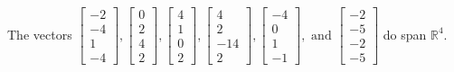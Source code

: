 \begin{exercise}
\begin{exerciseStatement}
  \end{exerciseStatement}
  \begin{exerciseAnswer}
   The vectors \(\left[\begin{array}{r}
-2 \\
-4 \\
1 \\
-4
\end{array}\right] , \left[\begin{array}{r}
0 \\
2 \\
4 \\
2
\end{array}\right] , \left[\begin{array}{r}
4 \\
1 \\
0 \\
2
\end{array}\right] , \left[\begin{array}{r}
4 \\
2 \\
-14 \\
2
\end{array}\right] , \left[\begin{array}{r}
-4 \\
0 \\
1 \\
-1
\end{array}\right] , \text{ and } \left[\begin{array}{r}
-2 \\
-5 \\
-2 \\
-5
\end{array}\right]\) 
  	 do  
	span \(\mathbb{R}^4\).
  


  \end{exerciseAnswer}
\end{exercise}